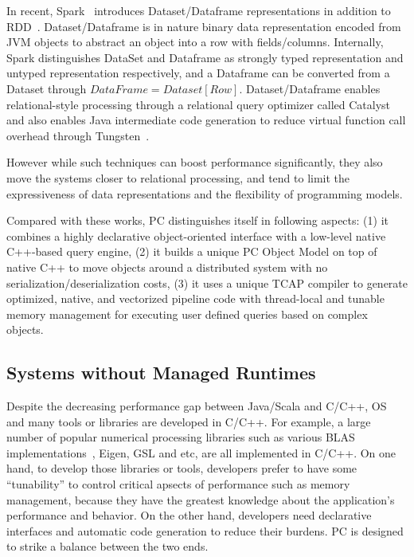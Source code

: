 In recent, Spark~\cite{tungsten} introduces Dataset/Dataframe representations
in addition to RDD~\cite{zaharia2012resilient}. Dataset/Dataframe is
in nature binary data representation encoded from JVM objects to
abstract an object  into a row with fields/columns. Internally,
Spark distinguishes DataSet and Dataframe as strongly typed representation and
untyped representation respectively, and a Dataframe can be
converted from a Dataset through $ DataFrame =
Dataset[Row] $. Dataset/Dataframe enables relational-style processing
through a relational query optimizer called Catalyst and
also enables Java intermediate code generation to reduce virtual
function call overhead through Tungsten~\cite{tungsten}. 

However while
such techniques can boost performance significantly, they also move the
systems closer to relational processing, and tend to limit the
expressiveness of data representations and the flexibility of
programming models.


\vspace{5pt}
Compared with these works, 
PC distinguishes itself in following aspects:
(1) it combines a highly declarative object-oriented interface with a
low-level native
C++-based query engine, (2) it builds a unique PC Object Model on top of
native C++ to move objects around a distributed system with no
serialization/deserialization costs, (3) it uses a unique TCAP
compiler to generate optimized, native, and vectorized
pipeline code with thread-local and tunable memory management for executing
user defined queries based on complex objects.

\subsection {Systems without Managed Runtimes}
Despite the decreasing performance gap between Java/Scala and C/C++,
OS and many tools or libraries are developed in C/C++. For example,
a large number of popular numerical processing libraries such as
various BLAS implementations~\cite{barrachina2008evaluation}, Eigen, GSL
and etc, are all implemented in C/C++. 
On one hand, to
develop those libraries or tools, developers prefer to have some ``tunability'' to control critical apsects of performance such as
memory management, because they have the greatest knowledge about the
application's performance and behavior. On the other hand,
developers need declarative interfaces and automatic code generation
to reduce their burdens. PC is designed to strike a balance between
the two ends. 

